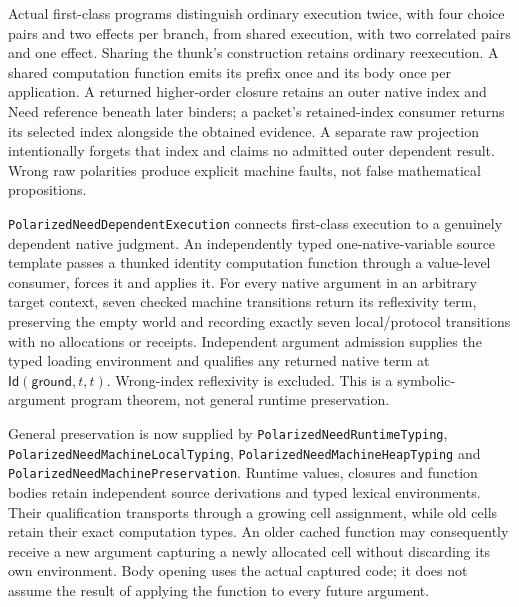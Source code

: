\documentclass[11pt]{article}
\theoremstyle{definition}
\theoremstyle{remark}
\begin{document}
Actual first-class programs distinguish ordinary execution twice, with four
choice pairs and two effects per branch, from shared execution, with two
correlated pairs and one effect. Sharing the thunk's construction retains
ordinary reexecution. A shared computation function emits its prefix once
and its body once per application. A returned higher-order closure retains
an outer native index and Need reference beneath later binders; a packet's
retained-index consumer returns its selected index alongside the obtained
evidence. A separate raw projection intentionally forgets that index and
claims no admitted outer dependent result. Wrong raw polarities
produce explicit machine faults, not false mathematical propositions.

\nolinkurl{PolarizedNeedDependentExecution} connects first-class execution
to a genuinely dependent native judgment. An independently typed
one-native-variable source template passes a thunked identity computation
function through a value-level consumer, forces it and applies it. For every
native argument in an arbitrary target context, seven checked machine
transitions return its reflexivity term, preserving the empty world and
recording exactly seven local/protocol transitions with no allocations or
receipts. Independent argument admission supplies the typed loading
environment and qualifies any returned native term at
$\mathsf{Id}(\mathsf{ground},t,t)$. Wrong-index reflexivity is excluded.
This is a symbolic-argument program theorem, not general runtime preservation.

General preservation is now supplied by
\nolinkurl{PolarizedNeedRuntimeTyping},
\nolinkurl{PolarizedNeedMachineLocalTyping},
\nolinkurl{PolarizedNeedMachineHeapTyping} and
\nolinkurl{PolarizedNeedMachinePreservation}.
Runtime values, closures and function bodies retain independent source
derivations and typed lexical environments. Their qualification transports
through a growing cell assignment, while old cells retain their exact
computation types. An older cached function may consequently receive a new
argument capturing a newly allocated cell without discarding its own
environment. Body opening uses the actual captured code; it does not assume
the result of applying the function to every future argument.
\end{document}
